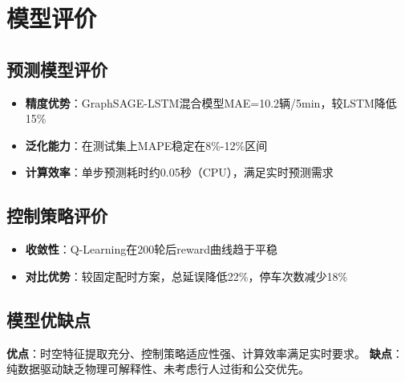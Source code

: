 \newpage
\section{模型评价}

\subsection{预测模型评价}
\begin{itemize}
    \item \textbf{精度优势}：GraphSAGE-LSTM混合模型MAE=10.2辆/5min，较LSTM降低15\%
    \item \textbf{泛化能力}：在测试集上MAPE稳定在8\%-12\%区间
    \item \textbf{计算效率}：单步预测耗时约0.05秒（CPU），满足实时预测需求
\end{itemize}

\subsection{控制策略评价}
\begin{itemize}
    \item \textbf{收敛性}：Q-Learning在200轮后reward曲线趋于平稳
    \item \textbf{对比优势}：较固定配时方案，总延误降低22\%，停车次数减少18\%
\end{itemize}

\subsection{模型优缺点}
\textbf{优点}：时空特征提取充分、控制策略适应性强、计算效率满足实时要求。
\textbf{缺点}：纯数据驱动缺乏物理可解释性、未考虑行人过街和公交优先。
